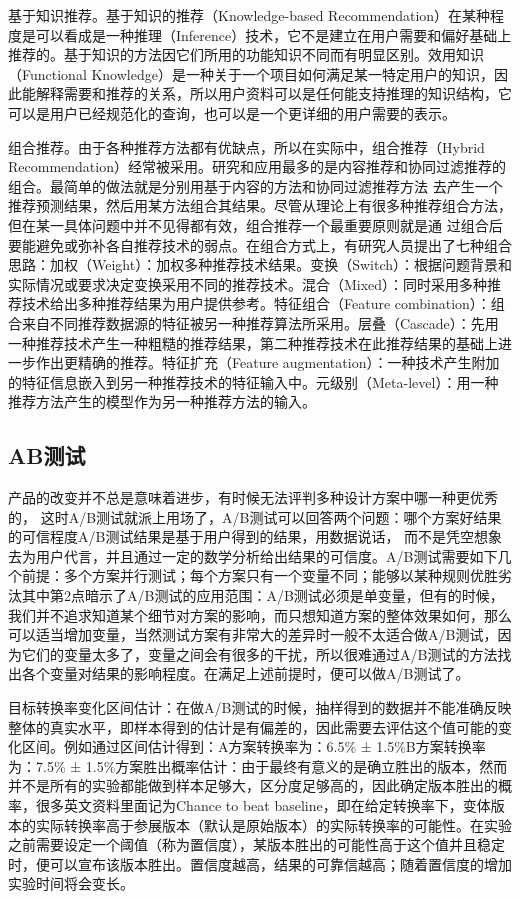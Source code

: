     基于知识推荐。基于知识的推荐（Knowledge-based Recommendation）在某种程度是可以看成是一种推理（Inference）技术，它不是建立在用户需要和偏好基础上推荐的。基于知识的方法因它们所用的功能知识不同而有明显区别。效用知识（Functional Knowledge）是一种关于一个项目如何满足某一特定用户的知识，因此能解释需要和推荐的关系，所以用户资料可以是任何能支持推理的知识结构，它可以是用户已经规范化的查询，也可以是一个更详细的用户需要的表示。

    组合推荐。由于各种推荐方法都有优缺点，所以在实际中，组合推荐（Hybrid Recommendation）经常被采用。研究和应用最多的是内容推荐和协同过滤推荐的组合。最简单的做法就是分别用基于内容的方法和协同过滤推荐方法 去产生一个推荐预测结果，然后用某方法组合其结果。尽管从理论上有很多种推荐组合方法，但在某一具体问题中并不见得都有效，组合推荐一个最重要原则就是通 过组合后要能避免或弥补各自推荐技术的弱点。在组合方式上，有研究人员提出了七种组合思路：加权（Weight）：加权多种推荐技术结果。变换（Switch）：根据问题背景和实际情况或要求决定变换采用不同的推荐技术。混合（Mixed）：同时采用多种推荐技术给出多种推荐结果为用户提供参考。特征组合（Feature combination）：组合来自不同推荐数据源的特征被另一种推荐算法所采用。层叠（Cascade）：先用一种推荐技术产生一种粗糙的推荐结果，第二种推荐技术在此推荐结果的基础上进一步作出更精确的推荐。特征扩充（Feature augmentation）：一种技术产生附加的特征信息嵌入到另一种推荐技术的特征输入中。元级别（Meta-level）：用一种推荐方法产生的模型作为另一种推荐方法的输入。

    \subsection{AB测试}
    产品的改变并不总是意味着进步，有时候无法评判多种设计方案中哪一种更优秀的， 这时A/B测试就派上用场了，A/B测试可以回答两个问题：哪个方案好结果的可信程度A/B测试结果是基于用户得到的结果，用数据说话， 而不是凭空想象去为用户代言，并且通过一定的数学分析给出结果的可信度。A/B测试需要如下几个前提：多个方案并行测试；每个方案只有一个变量不同；能够以某种规则优胜劣汰其中第2点暗示了A/B测试的应用范围：A/B测试必须是单变量，但有的时候，我们并不追求知道某个细节对方案的影响，而只想知道方案的整体效果如何，那么可以适当增加变量，当然测试方案有非常大的差异时一般不太适合做A/B测试，因为它们的变量太多了，变量之间会有很多的干扰，所以很难通过A/B测试的方法找出各个变量对结果的影响程度。在满足上述前提时，便可以做A/B测试了。

    目标转换率变化区间估计：在做A/B测试的时候，抽样得到的数据并不能准确反映整体的真实水平，即样本得到的估计是有偏差的，因此需要去评估这个值可能的变化区间。例如通过区间估计得到：A方案转换率为：6.5\% ± 1.5\%B方案转换率为：7.5\% ± 1.5\%方案胜出概率估计：由于最终有意义的是确立胜出的版本，然而并不是所有的实验都能做到样本足够大，区分度足够高的，因此确定版本胜出的概率，很多英文资料里面记为Chance to beat baseline，即在给定转换率下，变体版本的实际转换率高于参展版本（默认是原始版本）的实际转换率的可能性。在实验之前需要设定一个阈值（称为置信度），某版本胜出的可能性高于这个值并且稳定时，便可以宣布该版本胜出。置信度越高，结果的可靠信越高；随着置信度的增加实验时间将会变长。

